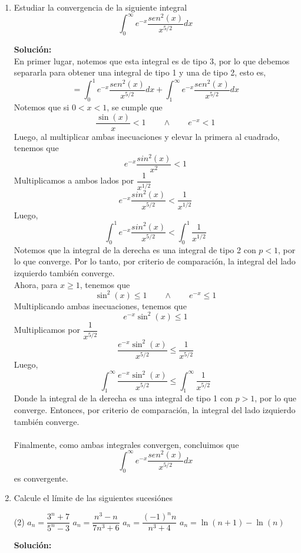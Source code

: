 \documentclass[12pt]{article}
\newenvironment{solucion}
{\begin{mdframed}[backgroundcolor=black!10]
		{\bf Solución:}\\
	}
	{
	\end{mdframed}
}
\newenvironment{preguntas}
{\begin{enumerate}\itemsep12pt
	}
	{
	\end{enumerate}
}
\newcommand{\ev}{\Big|}
\newcommand{\ra}{\rightarrow}
\begin{document}
\begin{preguntas}
\begin{solucion}
		En primer lugar,
		$$\displaystyle\int \dfrac{x}{x^2+1}$$
		Usamos $u = x^2+1 \ra du=2xdx$,
		$$\displaystyle\int \dfrac{x}{x^2+1} = \int\dfrac{du}{2u} = \dfrac{1}{2}ln(u) = \dfrac{1}{2}ln(x^2+1) = ln(\sqrt[]{x^2+1})$$
		En segundo lugar,
		$$\int \dfrac{3}{3x+1}dx$$
		Usamos $u=3x+1 \ra du = 3dx$,
		$$\int \dfrac{3}{3x+1}dx = \int \dfrac{du}{u} = ln(u) = ln(3x+1)$$
		Volviendo al problema original,
		$$I = \lim\limits_{a\ra \infty} (ln(\sqrt[]{x^2+1})-ln(3x+1)) \ev_0^a$$
		$$= \lim\limits_{a\ra \infty} ln \left( \dfrac{\sqrt[]{x^2+1}}{3x+1} \right) \ev_0^a$$
		$$= \lim\limits_{a\ra \infty} ln \left( \dfrac{\sqrt[]{a^2+1}}{3a+1} \right) - ln(1)$$
		$$I = ln\left(\dfrac{1}{3}\right) = -ln(3)$$
\end{solucion}
\item Estudiar la convergencia de la siguiente integral
$$\displaystyle\int_{0}^{\infty} e^{-x} \dfrac{sen^2(x)}{x^{5/2}}dx$$
\begin{solucion}
En primer lugar, notemos que esta integral es de tipo 3, por lo que debemos separarla para obtener una integral de tipo 1 y una de tipo 2, esto es,
$$=\displaystyle\int_{0}^{1} e^{-x} \dfrac{sen^2(x)}{x^{5/2}}dx +
\displaystyle\int_{1}^{\infty} e^{-x} \dfrac{sen^2(x)}{x^{5/2}}dx$$
Notemos que si $ 0 < x < 1$, se cumple que
$$\dfrac{\sin(x)}{x} < 1 \qquad \wedge \qquad e^{-x} < 1$$
Luego, al multiplicar ambas inecuaciones y elevar la primera al cuadrado, tenemos que
$$e^{-x}\dfrac{sin^2(x)}{x^2} < 1$$
Multiplicamos a ambos lados por $\dfrac{1}{x^{1/2}}$
$$e^{-x}\dfrac{sin^2(x)}{x^{5/2}} < \dfrac{1}{x^{1/2}}$$
Luego,
$$\displaystyle\int_0^1 e^{-x}\dfrac{sin^2(x)}{x^{5/2}} < \displaystyle\int_0^1 \dfrac{1}{x^{1/2}}$$
Notemos que la integral de la derecha es una integral de tipo 2 con $p < 1$, por lo que converge. Por lo tanto, por criterio de comparación, la integral del lado izquierdo también converge.
\\
Ahora, para $x \geq 1$, tenemos que
$$\sin^2(x) \leq 1 \qquad \wedge \qquad e^{-x} \leq 1$$
Multiplicando ambas inecuaciones, tenemos que
$$e^{-x}\sin^2(x) \leq 1$$
Multiplicamos por $\dfrac{1}{x^{5/2}}$
$$\dfrac{e^{-x}\sin^2(x)}{x^{5/2}} \leq \dfrac{1}{x^{5/2}}$$
Luego,
$$\displaystyle\int_{1}^{\infty} \dfrac{e^{-x}\sin^2(x)}{x^{5/2}} \leq \displaystyle\int_{1}^{\infty} \dfrac{1}{x^{5/2}}$$
Donde la integral de la derecha es una integral de tipo 1 con $p > 1$, por lo que converge. Entonces, por criterio de comparación, la integral del lado izquierdo también converge.
\\\\
Finalmente, como ambas integrales convergen, concluimos que 
$$\displaystyle\int_{0}^{\infty} e^{-x} \dfrac{sen^2(x)}{x^{5/2}}dx$$
es convergente.
\end{solucion}
\item Calcule el límite de las siguientes sucesiónes
\begin{tasks}(2)
\task $a_n = \dfrac{3^n+7}{5^n-3}$
\task $a_n = \dfrac{n^3-n}{7n^3+6}$
\task $a_n = \dfrac{(-1)^n n}{n^3+4}$
\task $a_n=\ln(n+1)-\ln(n)$
\end{tasks}
\begin{solucion}


\end{solucion}
\end{preguntas}
\end{document}
